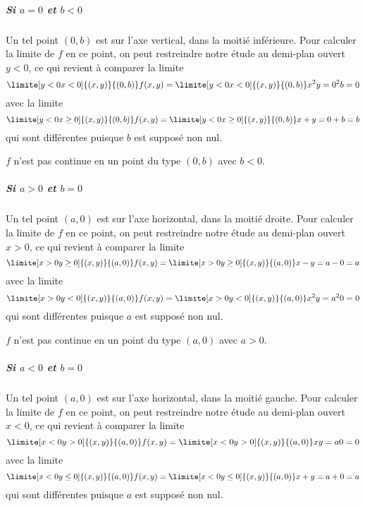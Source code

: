 \begin{example}
	\subparagraph{Si \( a = 0\) et \( b < 0\)} Un tel point \( (0,b)\) est sur
	l'axe vertical, dans la moitié inférieure. Pour calculer la limite de
	\( f\) en ce point, on peut restreindre notre étude au demi-plan ouvert
	\( y < 0\), ce qui revient à comparer la limite
	\begin{equation*}
		\limite[y<0\\x<0] {(x,y)} {(0,b)} f(x,y)     =  \limite[y<0\\x<
			0] {(x,y)} {(0,b)} x^2 y = 0^2 b = 0
	\end{equation*}
	avec la limite
	\begin{equation*}
		\limite[y<0\\x\geq 0] {(x,y)} {(0,b)} f(x,y) =  \limite[y<0\\x\geq 0]
		{(x,y)} {(0,b)} x+y = 0 + b = b
	\end{equation*}
	qui sont différentes puisque \( b\) est supposé non nul.

	\conclusion \( f\) n'est pas continue en un point du type \( (0,b)\) avec \( b
	< 0\).

	\subparagraph{Si \( a > 0\) et \( b = 0\)} Un tel point \( (a,0)\) est sur
	l'axe horizontal, dans la moitié droite. Pour calculer la limite de
	\( f\) en ce point, on peut restreindre notre étude au demi-plan ouvert
	\( x > 0\), ce qui revient à comparer la limite
	\begin{equation*}
		\limite[x>0\\y \geq 0] {(x,y)} {(a,0)} f(x,y) =   \limite[x>0\\y \geq
			0] {(x,y)} {(a,0)} x-y = a - 0 = a
	\end{equation*}
	avec la limite
	\begin{equation*}
		\limite[x>0\\y < 0] {(x,y)} {(a,0)} f(x,y) =   \limite[x>0\\y < 0]
		{(x,y)} {(a,0)} x^2y = a^2 0 = 0
	\end{equation*}
	qui sont différentes puisque \( a\) est supposé non nul.

	\conclusion \( f\) n'est pas continue en un point du type \( (a,0)\) avec \( a
	> 0\).

	\subparagraph{Si \( a < 0\) et \( b = 0\)} Un tel point \( (a,0)\) est sur
	l'axe horizontal, dans la moitié gauche. Pour calculer la limite de
	\( f\) en ce point, on peut restreindre notre étude au demi-plan ouvert
	\( x < 0\), ce qui revient à comparer la limite
	\begin{equation*}
		\limite[x<0\\y> 0] {(x,y)} {(a,0)} f(x,y) =   \limite[x<0\\y>
			0] {(x,y)} {(a,0)} x y = a 0 = 0
	\end{equation*}
	avec la limite
	\begin{equation*}
		\limite[x<0\\y\leq 0] {(x,y)} {(a,0)} f(x,y) =   \limite[x<0\\y\leq0]
		{(x,y)} {(a,0)} x+y = a + 0 = a
	\end{equation*}
	qui sont différentes puisque \( a\) est supposé non nul.


\end{example}
